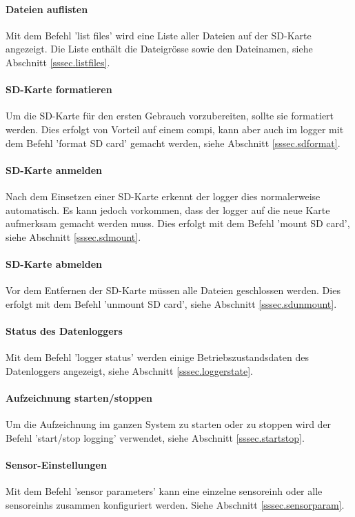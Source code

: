 \paragraph{Dateien auflisten} Mit dem Befehl 'list files' wird eine Liste aller Dateien auf der SD-Karte angezeigt. Die Liste enthält die Dateigrösse sowie den Dateinamen, siehe Abschnitt \ref{sssec.listfiles}.

\paragraph{SD-Karte formatieren} Um die SD-Karte für den ersten Gebrauch vorzubereiten, sollte sie formatiert werden. Dies erfolgt von Vorteil auf einem \gls{compi}, kann aber auch im \gls{logger} mit dem Befehl 'format SD card' gemacht werden, siehe Abschnitt \ref{sssec.sdformat}.

\paragraph{SD-Karte anmelden} Nach dem Einsetzen einer SD-Karte erkennt der \gls{logger} dies normalerweise automatisch. Es kann jedoch vorkommen, dass der \gls{logger} auf die neue Karte aufmerksam gemacht werden muss. Dies erfolgt mit dem Befehl 'mount SD card', siehe Abschnitt \ref{sssec.sdmount}.

\paragraph{SD-Karte abmelden} Vor dem Entfernen der SD-Karte müssen alle Dateien geschlossen werden. Dies erfolgt mit dem Befehl 'unmount SD card', siehe Abschnitt \ref{sssec.sdunmount}.

\paragraph{Status des Datenloggers} Mit dem Befehl 'logger status' werden einige Betriebszustandsdaten des Datenloggers angezeigt, siehe Abschnitt \ref{sssec.loggerstate}.

\paragraph{Aufzeichnung starten/stoppen} Um die Aufzeichnung im ganzen System zu starten oder zu stoppen wird der Befehl 'start/stop logging' verwendet, siehe Abschnitt \ref{sssec.startstop}.

\paragraph{Sensor-Einstellungen} Mit dem Befehl 'sensor parameters' kann eine einzelne \gls{sensoreinh} oder alle \glspl{sensoreinh} zusammen konfiguriert werden. Siehe Abschnitt \ref{sssec.sensorparam}.

